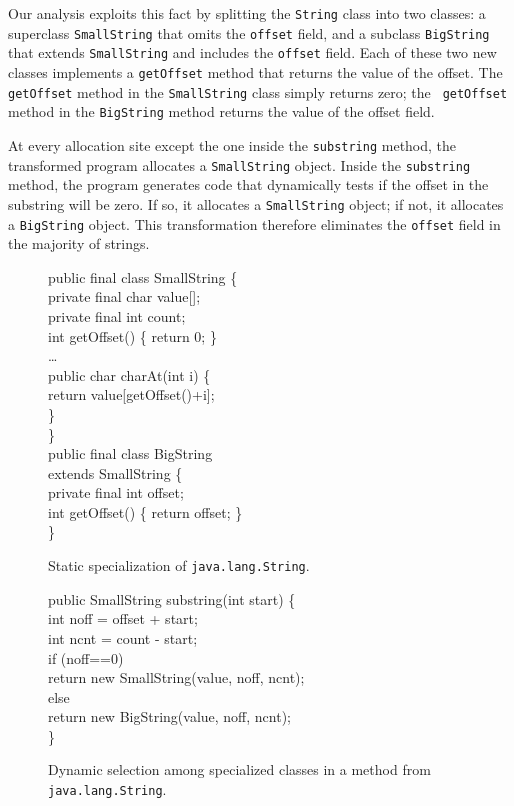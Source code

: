 \documentclass[preprint]{acmconf}
\begin{document}
Our analysis exploits this fact by splitting the 
{\tt String} class into two classes: a superclass {\tt SmallString}
that omits the {\tt offset} field, and a subclass {\tt BigString} that
extends {\tt SmallString} and includes the {\tt offset} field. 
Each of these two new classes implements a {\tt getOffset} method
that returns the value of the offset. The {\tt getOffset} method
in the {\tt SmallString} class simply returns zero; the {\tt
getOffset} method in the {\tt BigString} method returns the 
value of the offset field. 

At every allocation site except the one inside the {\tt substring}
method, the transformed program allocates a {\tt SmallString} 
object. Inside the {\tt substring} method, the program generates
code that dynamically tests if the offset in the substring
will be zero. If so, it allocates a {\tt SmallString} object;
if not, it allocates a {\tt BigString} object. This transformation
therefore eliminates the {\tt offset} field in the majority
of strings. 

\begin{figure}
\begin{samplecode}
public final class SmallString \{\\
\>private final char value[];\\
\>private final int count;\\
\>int getOffset() \{ return 0; \}\\
\>\ldots\\
\>public char charAt(int i) \{\\
\>\>return value[getOffset()+i];\\
\>\}\\
\}\\
public final class BigString\\
\>\>extends SmallString \{\\
\>private final int offset;\\
\>int getOffset() \{ return offset; \}\\
\}\\
\end{samplecode}
\caption{Static specialization of {\tt java.lang.String}.}
\label{fig:big-small}
\end{figure}

\begin{figure}
\begin{samplecode}
public SmallString substring(int start) \{\\
\>int noff = offset + start;\\
\>int ncnt = count - start;\\
\>if (noff==0)\\
\>\>return new SmallString(value, noff, ncnt);\\
\>else\\
\>\>return new BigString(value, noff, ncnt);\\
\}\\
\end{samplecode}
\caption{Dynamic selection among specialized classes in a method
  from {\tt java.lang.String}.}
\label{fig:dyn-select}
\end{figure}
\end{document}
